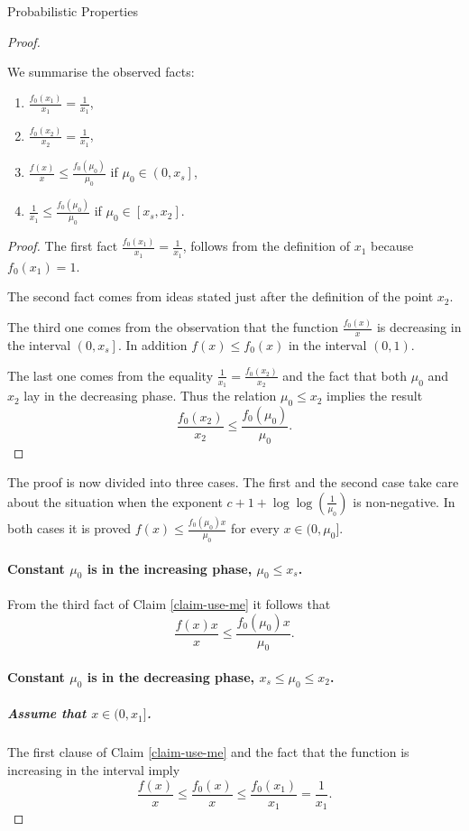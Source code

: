 \begin{section}{Probabilistic Properties}
\begin{proof}
\begin{claim}
\label{claim-use-me}
We summarise the observed facts:
\begin{enumerate}
\item $\frac{f_0(x_1)}{x_1} = \frac{1}{x_1}$,
\item $\frac{f_0(x_2)}{x_2} = \frac{1}{x_1}$,
\item $\frac{f(x)}{x} \leq \frac{f_0(\mu_0)}{\mu_0}$ if $\mu_0 \in \left(0, x_s \right]$,
\item $\frac{1}{x_1} \leq \frac{f_0(\mu_0)}{\mu_0}$ if $\mu_0 \in \left[x_s, x_2 \right]$.
\end{enumerate}
\end{claim}
\begin{proof}
The first fact $\frac{f_0(x_1)}{x_1} = \frac{1}{x_1}$, follows from the definition of $x_1$ because $f_0(x_1) = 1$. 

The second fact comes from ideas stated just after the definition of the point $x_2$.

The third one comes from the observation that the function $\frac{f_0(x)}{x}$ is decreasing in the interval $\left(0, x_s \right]$. In addition $f(x) \leq f_0(x)$ in the interval $(0, 1)$.

The last one comes from the equality $\frac{1}{x_1} = \frac{f_0(x_2)}{x_2}$ and the fact that both $\mu_0$ and $x_2$ lay in the decreasing phase. Thus the relation $\mu_0 \leq x_2$ implies the result \[ \frac{f_0(x_2)}{x_2} \leq \frac{f_0(\mu_0)}{\mu_0} \text{.} \]
\end{proof}

The proof is now divided into three cases. The first and the second case take care about the situation when the exponent $c + 1 + \log \log \left(\frac{1}{\mu_0}\right)$ is non-negative. In both cases it is proved $f(x) \leq \frac{f_0(\mu_0)x}{\mu_0}$ for every $x \in (0, \mu_0]$.
\paragraph{Constant $\mu_0$ is in the increasing phase, $\mu_0 \leq x_s$.}
From the third fact of Claim \ref{claim-use-me} it follows that \[ \frac{f(x)x}{x} \leq \frac{f_0(\mu_0)x}{\mu_0} \text{.} \]

\paragraph{Constant $\mu_0$ is in the decreasing phase, $x_s \leq \mu_0 \leq x_2$.}
\subparagraph{Assume that $x \in (0, x_1]$.} The first clause of Claim \ref{claim-use-me} and the fact that the function is increasing in the interval imply
\[
	\frac{f(x)}{x} \leq \frac{f_0(x)}{x} \leq \frac{f_0(x_1)}{x_1} = \frac{1}{x_1} \text{.}
\]


\end{proof}
\end{section}
